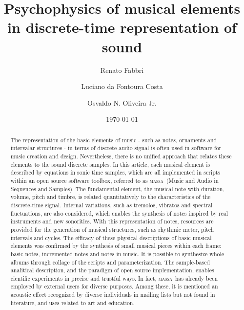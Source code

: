 \documentclass[
 aip,
 jmp,
 amsmath,amssymb,
 reprint,
]{revtex4-1}
\newcommand{\massa}{{\large \textsc{massa}}}
\begin{document}

\title{Psychophysics of musical elements in discrete-time representation of sound}

\author{Renato Fabbri}

\author{Luciano da Fontoura Costa}

 \author{Osvaldo N. Oliveira Jr.}

\date{\today}
\begin{abstract}

    The representation of the basic elements of music - such as notes, ornaments and intervalar structures - in terms of discrete audio signal is often used in software for music creation and design. Nevertheless, there is no unified approach that relates these elements to the sound discrete samples. In this article, each musical element is described by equations in sonic time samples, which are all implemented in scripts within an open source software toolbox, referred to as \massa\ (Music and Audio in Sequences and Samples). The fundamental element, the musical note with duration, volume, pitch and timbre, is related quantitatively to the characteristics of the discrete-time signal. Internal variations, such as tremolos, vibratos and spectral fluctuations, are also considered, which enables the synthesis of notes inspired by real instruments and new sonorities. With this representation of notes, resources are provided for the generation of musical structures, such as rhythmic meter, pitch intervals and cycles. The efficacy of these physical descriptions of basic musical elements was confirmed by the synthesis of small musical pieces within each frame: basic notes, incremented notes and notes in music. It is possible to synthesize whole albums through collage of the scripts and parameterization. 
    The sample-based analitical description, and the paradigm of open source implementation, enables cientific experiments in precise and trustful ways. In fact, \massa\ has already been employed by external users for diverse purposes. Among these, it is mentioned an acoustic effect recognized by diverse individuals in mailing lists but not found in literature, and uses related to art and education.

\end{abstract}
\maketitle
\end{document}
